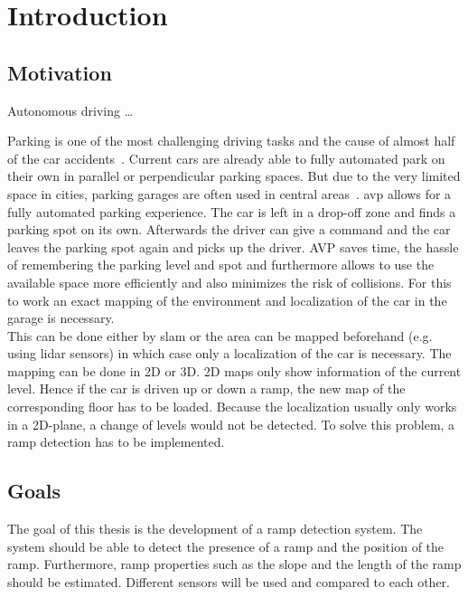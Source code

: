 \chapter{Introduction}
\label{ch:Introduction}

\section{Motivation}
Autonomous driving \dots

Parking is one of the most challenging driving tasks and the cause of almost half of the car accidents~\cite{accident}.
Current cars are already able to fully automated park on their own in parallel or perpendicular parking spaces.
But due to the very limited space in cities, parking garages are often used in central areas~\cite{Banzhaf2017}.
\gls{avp} allows for a fully automated parking experience.
The car is left in a drop-off zone and finds a parking spot on its own.
Afterwards the driver can give a command and the car leaves the parking spot again and picks up the driver.
AVP saves time, the hassle of remembering the parking level and spot and furthermore allows to use the available space more efficiently and also minimizes the risk of collisions.
For this to work an exact mapping of the environment and localization of the car in the garage is necessary.\\
This can be done either by \gls{slam} or the area can be mapped beforehand (e.g. using \gls{lidar} sensors) in which case only a localization of the car is necessary.
The mapping can be done in 2D or 3D. 2D maps only show information of the current level. Hence if the car is driven up or down a ramp, the new map of the corresponding floor has to be loaded.
Because the localization usually only works in a 2D-plane, a change of levels would not be detected.
To solve this problem, a ramp detection has to be implemented.



\section{Goals}
The goal of this thesis is the development of a ramp detection system.
The system should be able to detect the presence of a ramp and the position of the ramp.
Furthermore, ramp properties such as the slope and the length of the ramp should be estimated.
Different sensors will be used and compared to each other.




